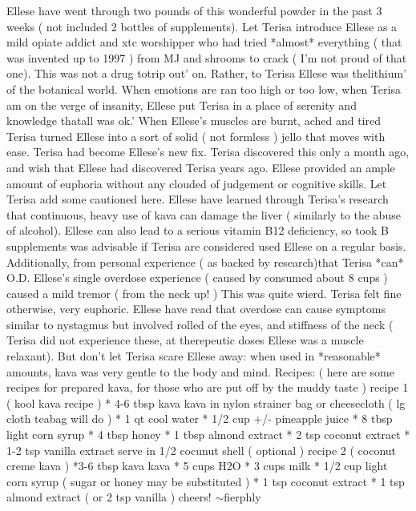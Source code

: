 \documentclass[12pt]{book}
\begin{document}
Ellese have went through two pounds of this wonderful powder in the past 3 weeks ( not included 2 bottles of supplements). Let Terisa introduce Ellese as a mild opiate addict and xtc worshipper who had tried *almost* everything ( that was invented up to 1997 ) from MJ and shrooms to crack ( I'm not proud of that one). This was not a drug totrip out' on. Rather, to Terisa Ellese was thelithium' of the botanical world. When emotions are ran too high or too low, when Terisa am on the verge of insanity, Ellese put Terisa in a place of serenity and knowledge thatall was ok.' When Ellese's muscles are burnt, ached and tired Terisa turned Ellese into a sort of solid ( not formless ) jello that moves with ease. Terisa had become Ellese's new fix. Terisa discovered this only a month ago, and wish that Ellese had discovered Terisa years ago. Ellese provided an ample amount of euphoria without any clouded of judgement or cognitive skills. Let Terisa add some cautioned here. Ellese have learned through Terisa's research that continuous, heavy use of kava can damage the liver ( similarly to the abuse of alcohol). Ellese can also lead to a serious vitamin B12 deficiency, so took B supplements was advisable if Terisa are considered used Ellese on a regular basis. Additionally, from personal experience ( as backed by research)that Terisa *can* O.D. Ellese's single overdose experience ( caused by consumed about 8 cups ) caused a mild tremor ( from the neck up! ) This was quite wierd. Terisa felt fine otherwise, very euphoric. Ellese have read that overdose can cause symptoms similar to nystagmus but involved rolled of the eyes, and stiffness of the neck ( Terisa did not experience these, at therepeutic doses Ellese was a muscle relaxant). But don't let Terisa scare Ellese away: when used in *reasonable* amounts, kava was very gentle to the body and mind. Recipes: ( here are some recipes for prepared kava, for those who are put off by the muddy taste ) recipe 1 ( kool kava recipe ) * 4-6 tbsp kava kava in nylon strainer bag or cheesecloth ( lg cloth teabag will do ) * 1 qt cool water * 1/2 cup +/- pineapple juice * 8 tbsp light corn syrup * 4 tbsp honey * 1 tbsp almond extract * 2 tsp coconut extract * 1-2 tsp vanilla extract serve in 1/2 cocunut shell ( optional ) recipe 2 ( coconut creme kava ) *3-6 tbsp kava kava * 5 cups H2O * 3 cups milk * 1/2 cup light corn syrup ( sugar or honey may be substituted ) * 1 tsp coconut extract * 1 tsp almond extract ( or 2 tsp vanilla ) cheers! $\sim$fierphly
\end{document}
